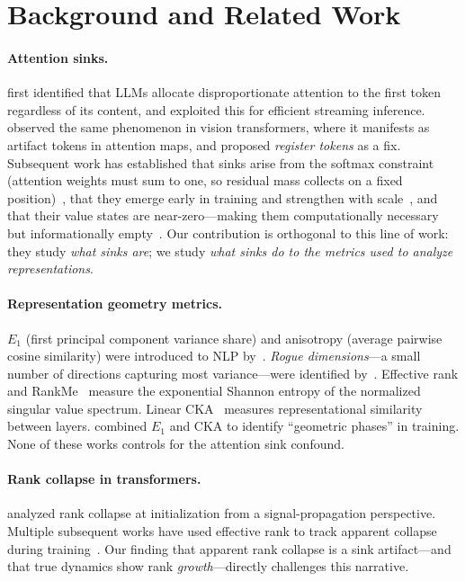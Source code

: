 \documentclass[11pt]{article}
\begin{document}
\section{Background and Related Work}\label{sec:related}

\paragraph{Attention sinks.}
\citet{xiao2023efficient} first identified that LLMs allocate disproportionate attention to the first token regardless of its content, and exploited this for efficient streaming inference. \citet{darcet2024vision} observed the same phenomenon in vision transformers, where it manifests as artifact tokens in attention maps, and proposed \emph{register tokens} as a fix. Subsequent work has established that sinks arise from the softmax constraint (attention weights must sum to one, so residual mass collects on a fixed position)~\citep{sun2024massive}, that they emerge early in training and strengthen with scale~\citep{gu2025attention}, and that their value states are near-zero---making them computationally necessary but informationally empty~\citep{barbero2025round}. Our contribution is orthogonal to this line of work: they study \emph{what sinks are}; we study \emph{what sinks do to the metrics used to analyze representations}.

\paragraph{Representation geometry metrics.}
$E_1$ (first principal component variance share) and anisotropy (average pairwise cosine similarity) were introduced to NLP by~\citet{ethayarajh2019contextual}. \emph{Rogue dimensions}---a small number of directions capturing most variance---were identified by~\citet{timkey2021all}. Effective rank and RankMe~\citep{garrido2023rankme} measure the exponential Shannon entropy of the normalized singular value spectrum. Linear CKA~\citep{kornblith2019similarity} measures representational similarity between layers. \citet{li2024geometric} combined $E_1$ and CKA to identify ``geometric phases'' in training. None of these works controls for the attention sink confound.

\paragraph{Rank collapse in transformers.}
\citet{noci2022signal} analyzed rank collapse at initialization from a signal-propagation perspective. Multiple subsequent works have used effective rank to track apparent collapse during training~\citep{dong2023attention,chen2024condensation}. Our finding that apparent rank collapse is a sink artifact---and that true dynamics show rank \emph{growth}---directly challenges this narrative.
\end{document}
